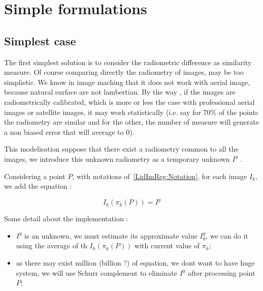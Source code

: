 
\section{Simple formulations}

\label{LIR:SimplF}


\subsection{Simplest case}

The first simplest solution is to consider the radiometric difference as
similarity measure.
Of course comparing directly the radiometry of images, may be too simplistic.
We know in image maching that it does not work with aerial image,  because natural
surface are not lambertian.   By the way , if the images
are radiometrically calibrated, which is more or less the case with professional
aerial images or satellite images, it may work statistically (i.e. say for $70\%$
of the points the radiometry are similar and for the other, the number of measure will
generate a non biased error that will average to $0$).


This modelisation suppose that there exist a radiometry 
common to all the images, we introduce this unknown radiometry as a 
temporary unknown $I^g$ .

Considering a point $P$, with notations of~\ref{LidImReg:Notation},
for each image $I_k$, we add  the equation :

\begin{equation}
    I_k(\pi_k(P)) = I^g \label{LIR:Eq1Point}
\end{equation}

Some detail about the implementation :

\begin{itemize}
    \item $I^g$ is an unknown, we must estimate its approximate value $I^g_0$,
          we can do it using the average of th $I_k(\pi_k(P))$ with
          current value of $\pi_k$;

    \item as there may exist million (billion ?) of equation, we dont
          want to have huge system, we will use Schurr complement to eliminate
          $I^g$ after processing point $P$;
\end{itemize}

